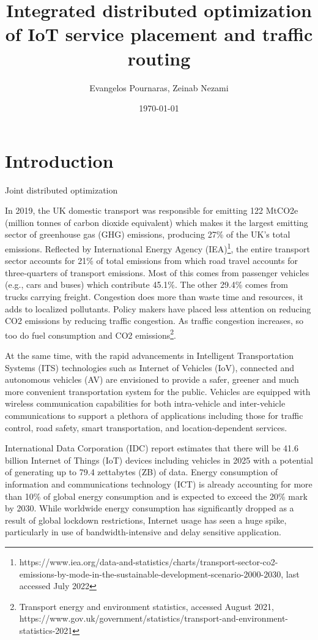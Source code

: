 \documentclass[twocolumn]{article}
\title{Integrated distributed optimization of IoT service placement and traffic routing}
\date{\today}
\author{Evangelos Pournaras, Zeinab Nezami}
\begin{document}
\maketitle


\section{Introduction}
\par Joint distributed optimization
\par In 2019, the UK domestic transport was responsible for emitting 122 MtCO2e (million tonnes of carbon dioxide equivalent) which makes it the largest emitting sector of greenhouse gas (GHG) emissions, producing 27\% of the
UK's total emissions. Reflected by International Energy Agency (IEA)\footnote{https://www.iea.org/data-and-statistics/charts/transport-sector-co2-emissions-by-mode-in-the-sustainable-development-scenario-2000-2030, last accessed July 2022}, the entire transport sector accounts for 21\% of total emissions from which road travel accounts for three-quarters of transport emissions. Most of this comes from passenger vehicles (e.g., cars and buses) which contribute 45.1\%. The other 29.4\% comes from trucks carrying freight. Congestion does more than waste time and resources, it adds to localized pollutants. Policy makers have placed less attention on reducing CO2 emissions by reducing traffic congestion. As traffic congestion increases, so too do fuel consumption and CO2 emissions\footnote{Transport energy and environment statistics, accessed August 2021, https://www.gov.uk/government/statistics/transport-and-environment-statistics-2021}.

\par At the same time, with the rapid advancements in Intelligent Transportation Systems (ITS) technologies such as Internet of Vehicles (IoV), connected and autonomous vehicles (AV) are envisioned to provide a safer, greener\cite{ligo2017throughput,cheng2018planning} and much more convenient\cite{chen2017service,silva2018ethical} transportation system for the public. Vehicles are equipped with wireless communication capabilities for both intra-vehicle and inter-vehicle communications to support a plethora of applications including those for traffic control, road safety, smart transportation, and location-dependent services\cite{lu2014connected,lin2017resource}.

\par International Data Corporation (IDC) report estimates that there will be 41.6 billion Internet of Things (IoT) devices including vehicles in 2025 with a potential of generating up to 79.4 zettabytes (ZB) of data\cite{gantz2019digitization}. 
Energy consumption of information and communications technology (ICT) is already accounting for more
than 10\% of global energy consumption and is expected to exceed the 20\% mark by 2030\cite{jones2018stop}. While worldwide energy consumption has significantly dropped as a result of global lockdown restrictions, Internet usage has seen a huge spike, particularly in use of bandwidth-intensive and delay sensitive application.
\end{document}

